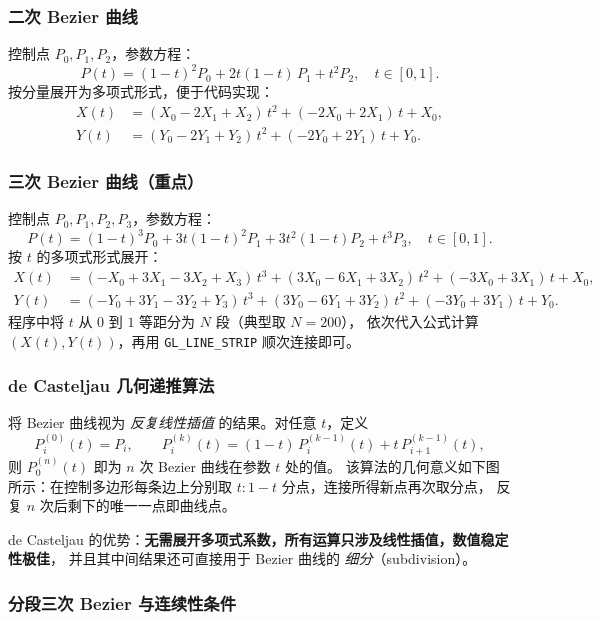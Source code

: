 \documentclass[a4paper,12pt]{ctexart}
\begin{document}
\subsubsection{二次 Bezier 曲线}

控制点 $P_0,P_1,P_2$，参数方程：
\[
    P(t) = (1-t)^{2} P_0 + 2t(1-t)\,P_1 + t^{2} P_2,\quad t\in[0,1].
\]
按分量展开为多项式形式，便于代码实现：
\[
\begin{aligned}
    X(t) &= (X_0 - 2X_1 + X_2)\,t^{2} + (-2X_0 + 2X_1)\,t + X_0 ,\\
    Y(t) &= (Y_0 - 2Y_1 + Y_2)\,t^{2} + (-2Y_0 + 2Y_1)\,t + Y_0 .
\end{aligned}
\]

\subsubsection{三次 Bezier 曲线（重点）}

控制点 $P_0,P_1,P_2,P_3$，参数方程：
\[
    P(t) = (1-t)^{3}P_0 + 3t(1-t)^{2}P_1 + 3t^{2}(1-t)P_2 + t^{3}P_3,\quad t\in[0,1].
\]
按 $t$ 的多项式形式展开：
\[
\begin{aligned}
    X(t) &= (-X_0+3X_1-3X_2+X_3)\,t^{3} + (3X_0-6X_1+3X_2)\,t^{2} + (-3X_0+3X_1)\,t + X_0 ,\\
    Y(t) &= (-Y_0+3Y_1-3Y_2+Y_3)\,t^{3} + (3Y_0-6Y_1+3Y_2)\,t^{2} + (-3Y_0+3Y_1)\,t + Y_0 .
\end{aligned}
\]
程序中将 $t$ 从 $0$ 到 $1$ 等距分为 $N$ 段（典型取 $N=200$），
依次代入公式计算 $(X(t),Y(t))$，再用 \texttt{GL\_LINE\_STRIP} 顺次连接即可。

\subsubsection{de Casteljau 几何递推算法}

将 Bezier 曲线视为 \emph{反复线性插值} 的结果。对任意 $t$，定义
\[
    P_i^{(0)}(t) = P_i,\qquad
    P_i^{(k)}(t) = (1-t)\,P_i^{(k-1)}(t) + t\,P_{i+1}^{(k-1)}(t),
\]
则 $P_0^{(n)}(t)$ 即为 $n$ 次 Bezier 曲线在参数 $t$ 处的值。
该算法的几何意义如下图所示：在控制多边形每条边上分别取 $t:1-t$ 分点，连接所得新点再次取分点，
反复 $n$ 次后剩下的唯一一点即曲线点。

de Casteljau 的优势：\textbf{无需展开多项式系数，所有运算只涉及线性插值，数值稳定性极佳}，
并且其中间结果还可直接用于 Bezier 曲线的 \emph{细分}（subdivision）。

\subsubsection{分段三次 Bezier 与连续性条件}
\end{document}
